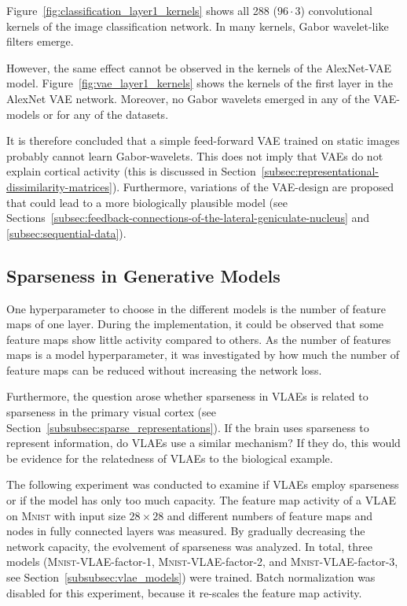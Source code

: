 Figure~\ref{fig:classification_layer1_kernels} shows all 288 ($96 \cdot 3$) convolutional kernels of the image classification network.
In many kernels, Gabor wavelet-like filters emerge.

However, the same effect cannot be observed in the kernels of the AlexNet-\ac{VAE} model.
Figure~\ref{fig:vae_layer1_kernels} shows the kernels of the first layer in the AlexNet \ac{VAE} network.
Moreover, no Gabor wavelets emerged in any of the \ac{VAE}-models or for any of the datasets.

It is therefore concluded that a simple feed-forward \ac{VAE} trained on static images probably cannot learn Gabor-wavelets.
This does not imply that \acp{VAE} do not explain cortical activity (this is discussed in Section~\ref{subsec:representational-dissimilarity-matrices}).
Furthermore, variations of the \ac{VAE}-design are proposed that could lead to a more biologically plausible model (see Sections~\ref{subsec:feedback-connections-of-the-lateral-geniculate-nucleus} and \ref{subsec:sequential-data}).


\subsection{Sparseness in Generative Models}\label{subsec:effective-network-capacity}
One hyperparameter to choose in the different models is the number of feature maps of one layer.
During the implementation, it could be observed that some feature maps show little activity compared to others.
As the number of features maps is a model hyperparameter, it was investigated by how much the number of feature maps can be reduced without increasing the network loss.

Furthermore, the question arose whether sparseness in \acp{VLAE} is related to sparseness in the primary visual cortex (see Section~\ref{subsubsec:sparse_representations}).
If the brain uses sparseness to represent information, do \acp{VLAE} use a similar mechanism?
If they do, this would be evidence for the relatedness of \acp{VLAE} to the biological example.

The following experiment was conducted to examine if \acp{VLAE} employ sparseness or if the model has only too much capacity.
The feature map activity of a \ac{VLAE} on \textsc{Mnist} with input size $28\times 28$ and different numbers of feature maps and nodes in fully connected layers was measured.
By gradually decreasing the network capacity, the evolvement of sparseness was analyzed.
In total, three models (\textsc{Mnist}-\ac{VLAE}-factor-1, \textsc{Mnist}-\ac{VLAE}-factor-2, and \textsc{Mnist}-\ac{VLAE}-factor-3, see Section~\ref{subsubsec:vlae_models}) were trained.
Batch normalization was disabled for this experiment, because it re-scales the feature map activity.

